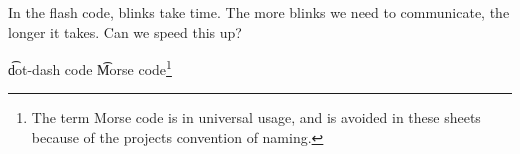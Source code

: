 

In the flash code, blinks take time.
The more blinks we need to communicate, the longer it takes.
Can we speed this up?


\t{dot-dash code}
\t{Morse code}\footnote{The term Morse code is in universal usage, and is avoided in these sheets because of the projects convention of naming.}


\blankpage
